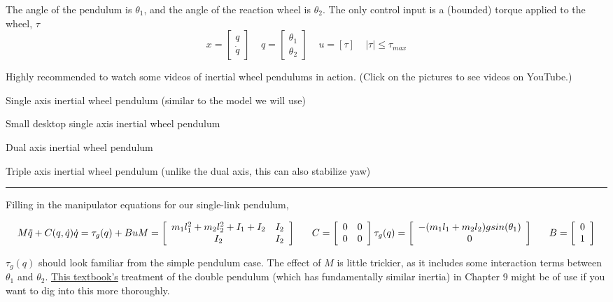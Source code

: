 \documentclass[11pt]{article}
\begin{document}
The angle of the pendulum is \(\theta_1\), and the angle of the reaction
wheel is \(\theta_2\). The only control input is a (bounded) torque
applied to the wheel, \(\tau\) \[
{x} = \left[ \begin{array}{c} q
\\ \dot q 
\end{array} \right]
\ \ \ \ \
{q} = \left[ \begin{array}{c}
\theta_1 \\
\theta_2 \end{array} \right]
\ \ \ \ \
{u} = \left[ \tau \right]
\ \ \ \ \
|\tau| \leq \tau_{max}
\]

Highly recommended to watch some videos of inertial wheel pendulums in
action. (Click on the pictures to see videos on YouTube.)

Single axis inertial wheel pendulum (similar to the model we will use)

Small desktop single axis inertial wheel pendulum

Dual axis inertial wheel pendulum

Triple axis inertial wheel pendulum (unlike the dual axis, this can also
stabilize yaw) 

    \begin{center}\rule{0.5\linewidth}{\linethickness}\end{center}

Filling in the manipulator equations for our single-link pendulum,

\[
M \ddot{q} + C(q, \dot{q})\dot{q} = \tau_g(q) + Bu \\
M = \left[ 
\begin{array}{c c} 
  m_1 l_1^2 + m_2 l_2^2 + I_1 + I_2 & I_2 \\
  I_2 & I_2
\end{array}
\right]
\ \ \ \ \ 
C = \left[
\begin{array}{c c}
 0 & 0 \\
 0 & 0
\end{array}
\right]\\
\tau_g(q) = \left[
\begin{array}{c}
 -(m_1 l_1 + m_2 l_2) g sin(\theta_1) \\ 0
\end{array}
\right]
\ \ \ \ \ 
B = \left[
\begin{array}{c}
 0 \\ 1
\end{array}
\right]
\]

\(\tau_g(q)\) should look familiar from the simple pendulum case. The
effect of \(M\) is little trickier, as it includes some interaction
terms between \(\theta_1\) and \(\theta_2\).
\href{http://home.deib.polimi.it/gini/robot/docs/spong.pdf}{This
textbook's} treatment of the double pendulum (which has fundamentally
similar inertia) in Chapter 9 might be of use if you want to dig into
this more thoroughly.
\end{document}

